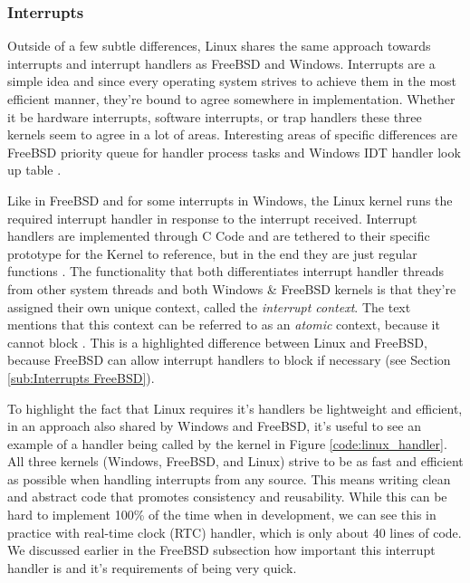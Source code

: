 \documentclass[10pt,draftclsnofoot,onecolumn]{IEEEtran}
\begin{document}
\subsubsection{Interrupts}
\label{sub:Interrupts Linux}
\par Outside of a few subtle differences, Linux shares the same approach towards interrupts and interrupt handlers as FreeBSD and Windows.
Interrupts are a simple idea and since every operating system strives to achieve them in the most efficient manner, they're bound to agree somewhere in implementation.
Whether it be hardware interrupts, software interrupts, or trap handlers these three kernels seem to agree in a lot of areas.
Interesting areas of specific differences are FreeBSD priority queue for handler process tasks and Windows IDT handler look up table \cite{bsd:1} \cite{win:1}.

\par Like in FreeBSD and for some interrupts in Windows, the Linux kernel runs the required interrupt handler in response to the interrupt received.
Interrupt handlers are implemented through C Code and are tethered to their specific prototype for the Kernel to reference, but in the end they are just regular functions \cite{linux:1}.
The functionality that both differentiates interrupt handler threads from other system threads and both Windows \& FreeBSD kernels is that they're assigned their own unique context, called the \textit{interrupt context}.
The text mentions that this context can be referred to as an \textit{atomic} context, because it cannot block \cite{linux:1}.
This is a highlighted difference between Linux and FreeBSD, because FreeBSD can allow interrupt handlers to block if necessary (see Section \ref{sub:Interrupts FreeBSD}).

\par To highlight the fact that Linux requires it's handlers be lightweight and efficient, in an approach also shared by Windows and FreeBSD, it's useful to see an example of a handler being called by the kernel in Figure \ref{code:linux_handler}.
All three kernels (Windows, FreeBSD, and Linux) strive to be as fast and efficient as possible when handling interrupts from any source.
This means writing clean and abstract code that promotes consistency and reusability.
While this can be hard to implement 100\% of the time when in development, we can see this in practice with real-time clock (RTC) handler, which is only about 40 lines of code.
We discussed earlier in the FreeBSD subsection how important this interrupt handler is and it's requirements of being very quick.
\end{document}
